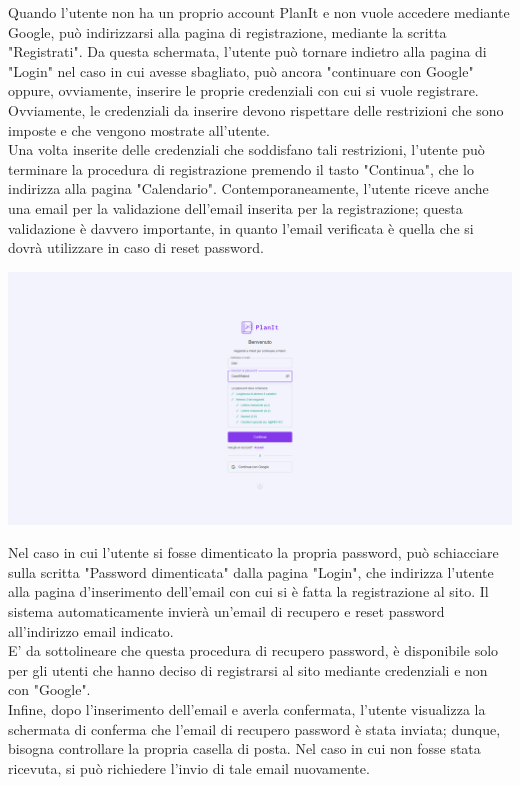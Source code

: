 Quando l'utente non ha un proprio account PlanIt e non vuole accedere mediante Google, può indirizzarsi alla pagina di registrazione, mediante la scritta "Registrati". Da questa schermata, l'utente può tornare indietro alla pagina di "Login" nel caso in cui avesse sbagliato, può ancora "continuare con Google" oppure, ovviamente, inserire le proprie credenziali con cui si vuole registrare. Ovviamente, le credenziali da inserire devono rispettare delle restrizioni che sono imposte e che vengono mostrate all'utente.\\
Una volta inserite delle credenziali che soddisfano tali restrizioni, l'utente può terminare la procedura di registrazione premendo il tasto "Continua", che lo indirizza alla pagina "Calendario". Contemporaneamente, l'utente riceve anche una email per la validazione dell'email inserita per la registrazione; questa validazione è davvero importante, in quanto l'email verificata è quella che si dovrà utilizzare in caso di reset password.

\begin{center}
    \includegraphics[width=1\textwidth, height=0.3\textheight]{img/png/FrontEnd/Homepage_Autenticazione/registrazione_valida.png}
\end{center}

Nel caso in cui l'utente si fosse dimenticato la propria password, può schiacciare sulla scritta "Password dimenticata" dalla pagina "Login", che indirizza l'utente alla pagina d'inserimento dell'email con cui si è fatta la registrazione al sito. Il sistema automaticamente invierà un'email di recupero e reset password all'indirizzo email indicato. \\
E' da sottolineare che questa procedura di recupero password, è disponibile solo per gli utenti che hanno deciso di registrarsi al sito mediante credenziali e non con "Google". \\
Infine, dopo l'inserimento dell'email e averla confermata, l'utente visualizza la schermata di conferma che l'email di recupero password è stata inviata; dunque, bisogna controllare la propria casella di posta. Nel caso in cui non fosse stata ricevuta, si può richiedere l'invio di tale email nuovamente.

